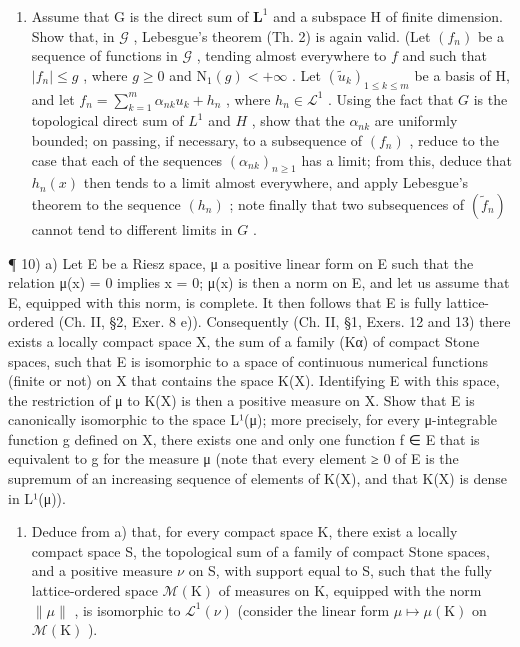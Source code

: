 \begin{enumerate}
\def\labelenumi{\alph{enumi})}
\setcounter{enumi}{1}
\tightlist
\item
  Assume that G is the direct sum of \(\mathbf{L}^1\) and a subspace H of finite dimension. Show that, in \(\mathcal{G}\) , Lebesgue's theorem (Th. 2) is again valid. (Let \((f_n)\) be a sequence of functions in \(\mathcal{G}\) , tending almost everywhere to \(f\) and such that \(|f_n| \leqslant g\) , where \(g \geqslant 0\) and \(\mathrm{N}_1(g) < +\infty\) . Let \((\widetilde{u}_k)_{1 \leqslant k \leqslant m}\) be a basis of H, and let \(f_n = \sum_{k=1}^{m} \alpha_{nk} u_k + h_n\) , where \(h_n \in \mathcal{L}^1\) . Using the fact that \(G\) is the topological direct sum of \(L^1\) and \(H\) , show that the \(\alpha_{nk}\) are uniformly bounded; on passing, if necessary, to a subsequence of \((f_n)\) , reduce to the case that each of the sequences \((\alpha_{nk})_{n \geqslant 1}\) has a limit; from this, deduce that \(h_n(x)\) then tends to a limit almost everywhere, and apply Lebesgue's theorem to the sequence \((h_n)\) ; note finally that two subsequences of \((\widetilde{f}_n)\) cannot tend to different limits in \(G\) .
\end{enumerate}

¶ 10) a) Let E be a Riesz space, μ a positive linear form on E such that the relation μ(\textbar x\textbar) = 0 implies x = 0; μ(\textbar x\textbar) is then a norm on E, and let us assume that E, equipped with this norm, is complete. It then follows that E is fully lattice-ordered (Ch. II, §2, Exer. 8 e)). Consequently (Ch. II, §1, Exers. 12 and 13) there exists a locally compact space X, the sum of a family (Kα) of compact Stone spaces, such that E is isomorphic to a space of continuous numerical functions (finite or not) on X that contains the space K(X). Identifying E with this space, the restriction of μ to K(X) is then a positive measure on X. Show that E is canonically isomorphic to the space L¹(μ); more precisely, for every μ-integrable function g defined on X, there exists one and only one function f ∈ E that is equivalent to g for the measure μ (note that every element ≥ 0 of E is the supremum of an increasing sequence of elements of K(X), and that K(X) is dense in L¹(μ)).

\begin{enumerate}
\def\labelenumi{\alph{enumi})}
\setcounter{enumi}{1}
\tightlist
\item
  Deduce from a) that, for every compact space K, there exist a locally compact space S, the topological sum of a family of compact Stone spaces, and a positive measure \(\nu\) on S, with support equal to S, such that the fully lattice-ordered space \(\mathcal{M}(\mathrm{K})\) of measures on K, equipped with the norm \(\|\mu\|\) , is isomorphic to \(\mathcal{L}^{1}(\nu)\) (consider the linear form \(\mu\mapsto\mu(\mathrm{K})\) on \(\mathcal{M}(\mathrm{K})\) ).
\end{enumerate}

